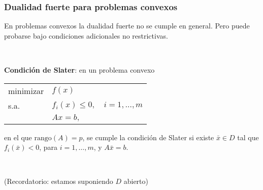 \documentclass{beamer}
\begin{document}
\begin{frame}
\frametitle{Dualidad fuerte para problemas convexos}

En problemas convexos la dualidad fuerte no se cumple en general. Pero puede probarse bajo condiciones adicionales no restrictivas. 

\

\textbf{Condición de Slater}: en un problema convexo
\begin{center}
\begin{tabular}{lll}
minimizar & $f(x)$ & \\
s.a. & $f_i(x)\leq 0,$  &  $i=1,\ldots,m$ \\
	 & $Ax=b,$  &  
\end{tabular}
\end{center}
en el que $\mbox{rango}(A)=p$, se cumple la condición de Slater si existe $\bar{x}\in D$  tal que $f_i(\bar{x})<0$, para $i=1,\ldots,m$, y $A\bar{x}=b$. 

\

(Recordatorio: estamos suponiendo $D$ abierto)

\end{frame}
\end{document}
